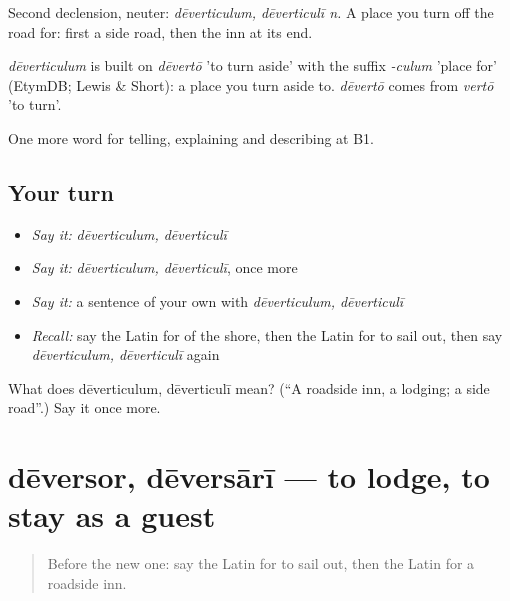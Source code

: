 Second declension, neuter: \emph{dēverticulum, dēverticulī n.} A place you turn off the road for: first a side road, then the inn at its end.

\begin{cousinweb}
\emph{dēverticulum} is built on \emph{dēvertō} 'to turn aside' with the suffix \emph{-culum} 'place for' (EtymDB; Lewis \& Short): a place you turn aside to. \emph{dēvertō} comes from \emph{vertō} 'to turn'.
\end{cousinweb}

\begin{grammarlens}[title={What you've built}]
One more word for telling, explaining and describing at B1.
\end{grammarlens}

\subsection*{Your turn}
\begin{itemize}
\raggedright
  \item \emph{Say it:} \emph{dēverticulum, dēverticulī}
  \item \emph{Say it:} \emph{dēverticulum, dēverticulī}, once more
  \item \emph{Say it:} a sentence of your own with \emph{dēverticulum, dēverticulī}
  \item \emph{Recall:} say the Latin for of the shore, then the Latin for to sail out, then say \emph{dēverticulum, dēverticulī} again
\end{itemize}

\begin{tcolorbox}[breakable,colback=teal!4,colframe=teal!35!black,title={Before you move on}]
What does dēverticulum, dēverticulī mean? (\textquotedblleft{}A roadside inn, a lodging; a side road\textquotedblright{}.) Say it once more.
\end{tcolorbox}
\section[dēversor, dēversārī]{dēversor, dēversārī — to lodge, to stay as a guest}

\label{lesson:LA-C445-deversor}



\begin{quote}
Before the new one: say the Latin for to sail out, then the Latin for a roadside inn.
\end{quote}

